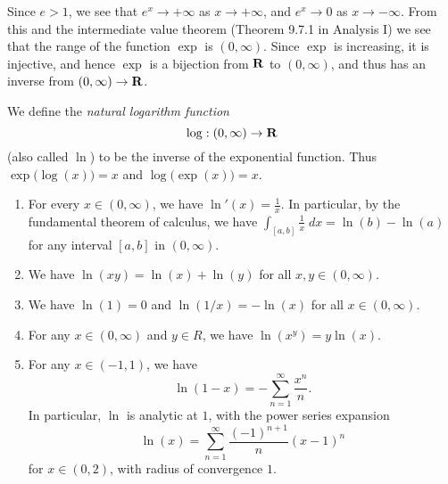 \begin{note}
    Since \(e > 1\), we see that \(e^x \to +\infty\) as \(x \to +\infty\), and \(e^x \to 0\) as \(x \to -\infty\).
    From this and the intermediate value theorem (Theorem 9.7.1 in Analysis I) we see that the range of the function \(\exp\) is \((0, \infty)\).
    Since \(\exp\) is increasing, it is injective, and hence \(\exp\) is a bijection from \(\mathbf{R}\) to \((0, \infty)\), and thus has an inverse from \((0, \infty) \to \mathbf{R}\).
\end{note}

\begin{definition}[Logarithm]\label{4.5.5}
    We define the \emph{natural logarithm function}
    \[
        \log : (0, \infty) \to \mathbf{R}
    \]
    (also called \(\ln\)) to be the inverse of the exponential function.
    Thus \(\exp\big(\log(x)\big) = x\) and \(\log\big(\exp(x)\big) = x\).
\end{definition}

\begin{theorem}\label{4.5.6}
    \quad
    \begin{enumerate}
        \item For every \(x \in (0, \infty)\), we have \(\ln'(x) = \frac{1}{x}\).
              In particular, by the fundamental theorem of calculus, we have \(\int_{[a, b]} \frac{1}{x} \; dx = \ln(b) - \ln(a)\) for any interval \([a, b]\) in \((0, \infty)\).
        \item We have \(\ln(xy) = \ln(x) + \ln(y)\) for all \(x, y \in (0, \infty)\).
        \item We have \(\ln(1) = 0\) and \(\ln(1 / x) = -\ln(x)\) for all \(x \in (0, \infty)\).
        \item For any \(x \in (0, \infty)\) and \(y \in R\), we have \(\ln(x^y) = y \ln(x)\).
        \item For any \(x \in (-1, 1)\), we have
              \[
                  \ln(1 - x) = - \sum_{n = 1}^\infty \frac{x^n}{n}.
              \]
              In particular, \(\ln\) is analytic at \(1\), with the power series expansion
              \[
                  \ln(x) = \sum_{n = 1}^\infty \frac{(-1)^{n + 1}}{n} (x - 1)^n
              \]
              for \(x \in (0, 2)\), with radius of convergence \(1\).
    \end{enumerate}
\end{theorem}

